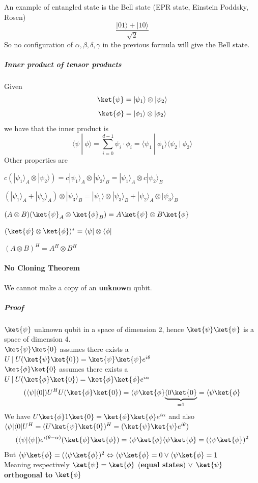 \documentclass[10pt]{report}
\begin{document}
An example of entangled state is the Bell state (EPR state, Einstein Poddsky, Rosen) $$\frac{|01\rangle + |10\rangle}{\sqrt{2}}$$
So no configuration of $\alpha,\beta,\delta,\gamma$ in the previous formula will give the Bell state.
\subparagraph{Inner product of tensor products} Given
$$\ket{\psi} = |\psi_1\rangle\otimes|\psi_2\rangle$$
$$\ket{\phi} = |\phi_1\rangle\otimes|\phi_2\rangle$$
we have that the inner product is
$$\langle \psi\:|\:\phi\rangle = \sum_{i=0}^{d-1}\psi_i\cdot\phi_i = \langle \psi_1\:|\:\phi_1\rangle\langle \psi_2\:|\:\phi_2\rangle$$
Other properties are\begin{list}{}{}
	\item $c(|\psi_1\rangle_A\otimes|\psi_2\rangle) = c|\psi_1\rangle_A\otimes |\psi_2\rangle_B = |\psi_1\rangle_A\otimes c|\psi_2\rangle_B$
	\item $(|\psi_1\rangle_A+|\psi_2\rangle_A)\otimes|\psi_3\rangle_B = |\psi_1\rangle\otimes|\psi_3\rangle_B + |\psi_2\rangle_A\otimes|\psi_3\rangle_B$
	\item $(A\otimes B)(\ket{\psi}_A\otimes\ket{\phi}_B) = A\ket{\psi} \otimes B\ket{\phi}$
	\item $(\ket{\psi}\otimes\ket{\phi})^* = \langle\psi|\otimes\langle\phi|$
	\item $(A\otimes B)^H = A^H\otimes B^H$
\end{list}
\paragraph{No Cloning Theorem} We cannot make a copy of an \textbf{unknown} qubit.
\subparagraph{Proof} $\ket{\psi}$ unknown qubit in a space of dimension 2, hence $\ket{\psi}\ket{\psi}$ is a space of dimension 4.\\
$\ket{\psi}\ket{0}$ assumes there exists a $U\:|\:U(\ket{\psi}\ket{0})=\ket{\psi}\ket{\psi} e^{i\theta}$\\
$\ket{\phi}\ket{0}$ assumes there exists a $U\:|\:U(\ket{\phi}\ket{0})=\ket{\phi}\ket{\phi} e^{i\alpha}$
$$(\langle\psi|\langle 0|)U^HU(\ket{\phi}\ket{0}) = \langle\psi\ket{\phi}\underset{=1}{\underbrace{\langle0\ket{0}}} = \langle\psi\ket{\phi}$$
We have $U\ket{\phi}1\ket{0} = \ket{\phi}\ket{\phi} e^{i\alpha}$ and also $\langle\psi|\langle 0|U^H = (U\ket{\psi}\ket{0})^H = (\ket{\psi}\ket{\psi} e^{i\theta})$
$$(\langle\psi|\langle\psi|)e^{i(\theta-\alpha)}(\ket{\phi}\ket{\phi}) = \langle\psi\ket{\phi}\langle\psi\ket{\phi} = (\langle\psi\ket{\phi})^2$$
But $\langle\psi\ket{\phi} = (\langle\psi\ket{\phi})^2 \Leftrightarrow \langle\psi\ket{\phi} = 0 \vee \langle\psi\ket{\phi} = 1$\\
Meaning respectively $\ket{\psi} = \ket{\phi}$ (\textbf{equal states}) $\vee$ $\ket{\psi}$ \textbf{orthogonal to} $\ket{\phi}$
\end{document}

